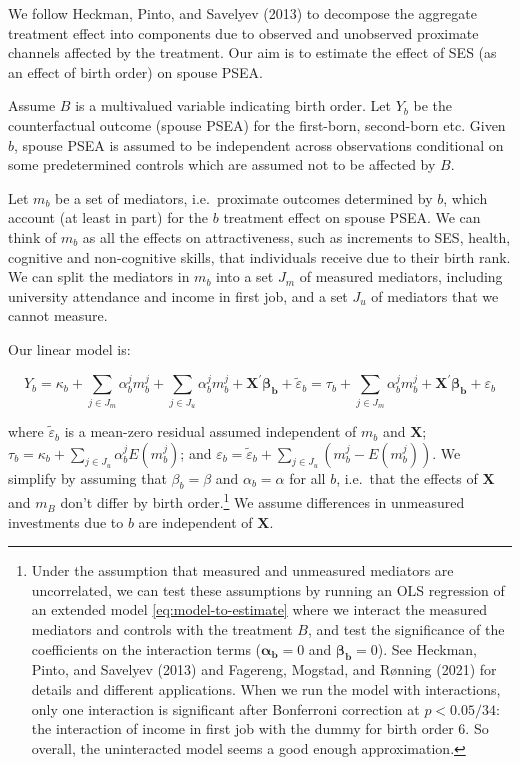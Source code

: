 \documentclass[
  12pt,
]{article}
\theoremstyle{definition}
\theoremstyle{definition}
\theoremstyle{definition}
\theoremstyle{definition}
\theoremstyle{remark}
\begin{document}
We follow Heckman, Pinto, and Savelyev (2013) to decompose the aggregate treatment
effect into components due to observed and unobserved proximate channels
affected by the treatment. Our aim is to estimate the effect of SES (as
an effect of birth order) on spouse PSEA.

Assume \(B\) is a multivalued variable indicating birth order. Let \(Y_b\) be
the counterfactual outcome (spouse PSEA) for the first-born, second-born etc.
Given \(b\), spouse PSEA is assumed to be independent across observations
conditional on some predetermined controls which are assumed not to be affected
by \(B\).

Let \(m_{b}\) be a set of mediators, i.e.~proximate outcomes
determined by \(b\), which account (at least in part) for the \(b\)
treatment effect on spouse PSEA. We can think of \(m_{b}\) as all
the effects on attractiveness, such as increments to SES, health,
cognitive and non-cognitive skills, that individuals receive due to
their birth rank. We can split the mediators in \(m_b\) into a set \(J_m\) of
measured mediators, including university attendance and income in first job,
and a set \(J_u\) of mediators that we cannot measure.

Our linear model is:

\begin{equation}
\label{eq:linear-model}
Y_b = \kappa_b + \sum_{j \in J_m} \alpha_b^j m^j_b+\sum_{j \in J_u} \alpha_b^j m^j_b + \mathbf{X^\prime} \symbf{\beta_b} + \tilde{\varepsilon}_b = \tau_b + \sum_{j \in J_m} \alpha_b^j m^j_b + \mathbf{X^\prime} \symbf{\beta_b} + \varepsilon_b 
\end{equation}

where \(\tilde{\varepsilon}_b\) is a mean-zero residual assumed independent of
\(m_b\) and \(\mathbf{X}\);
\(\tau_b = \kappa_b + \sum_{j \in J_u} \alpha_b^j E(m^j_b)\); and
\(\varepsilon_b = \tilde{\varepsilon}_b + \sum_{j \in J_u} (m^j_b - E(m^j_b))\).
We simplify by assuming that \(\beta_b = \beta\)
and \(\alpha_b = \alpha\) for all \(b\), i.e.~that the effects of \(\mathbf{X}\) and
\(m_B\) don't differ by birth order.\footnote{Under the assumption that measured and unmeasured mediators are
  uncorrelated, we can test these assumptions by running an OLS regression of an
  extended model \eqref{eq:model-to-estimate} where we interact the measured
  mediators and controls with the treatment \(B\), and test the significance of the
  coefficients on the interaction terms (\(\symbf{\alpha_b}=0\) and
  \(\symbf{\beta_b}=0\)). See Heckman, Pinto, and Savelyev (2013) and Fagereng, Mogstad, and Rønning (2021)
  for details and different applications. When we run the model with interactions,
  only one interaction is significant after Bonferroni correction at \(p < 0.05/34\):
  the interaction of income in first job with the dummy for birth order 6. So
  overall, the uninteracted model seems a good enough approximation.} We assume differences in
unmeasured investments due to \(b\) are independent of \(\mathbf{X}\).
\end{document}
